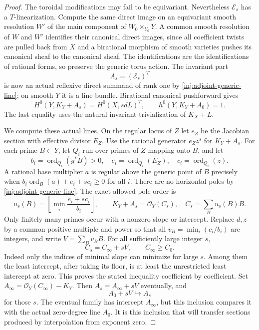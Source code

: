 \begin{proof}
The toroidal modifications may fail to be equivariant.
Nevertheless $\mathscr E_s$ has a $T$-linearization.  Compute the
same direct image on an equivariant smooth resolution $W'$ of
the main component of $W_0\times_{Y_0}Y$.  A common smooth
resolution of $W$ and $W'$ identifies their canonical direct
images, since all coefficient twists are pulled back from $X$
and a birational morphism of smooth varieties pushes its canonical
sheaf to the canonical sheaf.  The identifications are the
identifications of rational forms, so preserve the generic torus
action.  The invariant part
\[
 A_s=(\mathscr E_s)^T
\]
is now an actual reflexive direct summand of rank one by
\eqref{inj:adjoint-generic-line}; on smooth $Y$ it is a line
bundle.  Birational canonical pushforward gives
\begin{equation}\label{inj:global-invariant-identification}
 H^0(Y,K_Y+A_s)=H^0(X,sdL)^T,
 \qquad h^0(Y,K_Y+A_0)=1.
\end{equation}
The last equality uses the natural invariant trivialization of
$K_X+L$.

We compute these actual lines.  On the regular locus of $Z$ let
$e_Z$ be the Jacobian section with effective divisor $E_Z$.
Use the rational generator $e_Zz^s$ for $K_Y+A_s$.
For each prime $B\subset Y$, let $Q_i$ run over primes of $Z$
mapping onto $B$, and let
\[
 b_i=\operatorname{ord}_{Q_i}(g^*B)>0,
 \quad e_i=\operatorname{ord}_{Q_i}(E_Z),
 \quad c_i=\operatorname{ord}_{Q_i}(z).
\]
A rational base multiplier $a$ is regular above the generic point
of $B$ precisely when
$b_i\operatorname{ord}_B(a)+e_i+sc_i\ge0$ for all $i$.
There are no horizontal poles by
\eqref{inj:adjoint-generic-line}.  The exact allowed pole order is
\[
 u_s(B)=\left\lfloor\min_i\frac{e_i+sc_i}{b_i}\right\rfloor,
 \qquad K_Y+A_s=\mathcal O_Y(C_s),
 \quad C_s=\sum_Bu_s(B)B.
\]
Only finitely many primes occur with a nonzero slope or intercept.
Replace $d,z$ by a common positive multiple and power so that all
$v_B=\min_i(c_i/b_i)$ are integers, and write
$V=\sum_Bv_BB$.  For all sufficiently large integer $s$,
\begin{equation}\label{inj:affine-stabilization}
 C_s=C_\infty+sV,
 \qquad C_\infty\ge C_0.
\end{equation}
Indeed only the indices of minimal slope can minimize for large
$s$.  Among them the least intercept, after taking its floor,
is at least the unrestricted least intercept at zero.  This proves
the stated inequality coefficient by coefficient.  Set
$A_\infty=\mathcal O_Y(C_\infty)-K_Y$.  Then
$A_s=A_\infty+sV$ eventually, and
\begin{equation}\label{inj:line-inclusion}
 A_0+sV\hookrightarrow A_s
\end{equation}
for those $s$. The eventual family has intercept $A_\infty$, but this
inclusion compares it with the actual zero-degree line $A_0$. It is
this inclusion that will transfer sections produced by interpolation
from exponent zero.


\end{proof}
